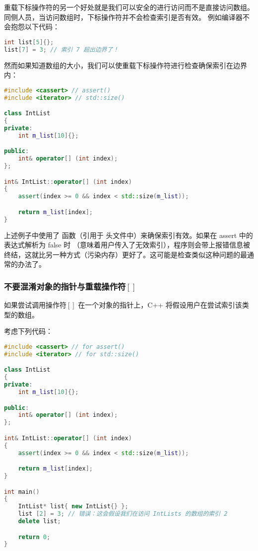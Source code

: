 \documentclass[../../LearnCpp.tex]{subfiles}
\begin{document}
重载下标操作符的另一个好处就是我们可以安全的进行访问而不是直接访问数组。同侧人员，当访问数组时，下标操作符并不会检查索引是否有效。
例如编译器不会抱怨以下代码：

\begin{lstlisting}[language=C++]
int list[5]{};
list[7] = 3; // 索引 7 超出边界了！
\end{lstlisting}

然而如果知道数组的大小，我们可以使重载下标操作符进行检查确保索引在边界内：

\begin{lstlisting}[language=C++]
#include <cassert> // assert()
#include <iterator> // std::size()

class IntList
{
private:
    int m_list[10]{};

public:
    int& operator[] (int index);
};

int& IntList::operator[] (int index)
{
    assert(index >= 0 && index < std::size(m_list));

    return m_list[index];
}
\end{lstlisting}

上述例子中使用了  函数（引用于  头文件中）来确保索引有效。如果在 assert 中的表达式解析为 false 时
（意味着用户传入了无效索引），程序则会带上报错信息被终结，这就比另一种方式（污染内存）更好了。这可能是检查类似这种问题的最通常的办法了。

\subsubsection*{不要混淆对象的指针与重载操作符$\left[\right]$}

如果尝试调用操作符$\left[\right]$ 在一个对象的指针上，C++ 将假设用户在尝试索引该类型的数组。

考虑下列代码：

\begin{lstlisting}[language=C++]
#include <cassert> // for assert()
#include <iterator> // for std::size()

class IntList
{
private:
    int m_list[10]{};

public:
    int& operator[] (int index);
};

int& IntList::operator[] (int index)
{
    assert(index >= 0 && index < std::size(m_list));

    return m_list[index];
}

int main()
{
    IntList* list{ new IntList{} };
    list [2] = 3; // 错误：这会假设我们在访问 IntLists 的数组的索引 2
    delete list;

    return 0;
}
\end{lstlisting}
\end{document}
